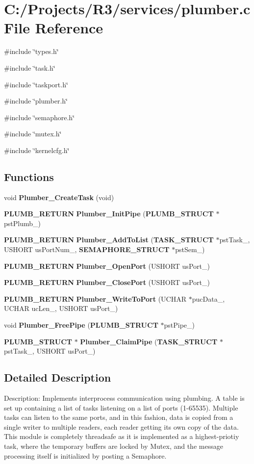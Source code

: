 \section{C:/Projects/R3/services/plumber.c File Reference}
\label{plumber_8c}
{\ttfamily \#include \char`\"{}types.h\char`\"{}}\par
{\ttfamily \#include \char`\"{}task.h\char`\"{}}\par
{\ttfamily \#include \char`\"{}taskport.h\char`\"{}}\par
{\ttfamily \#include \char`\"{}plumber.h\char`\"{}}\par
{\ttfamily \#include \char`\"{}semaphore.h\char`\"{}}\par
{\ttfamily \#include \char`\"{}mutex.h\char`\"{}}\par
{\ttfamily \#include \char`\"{}kernelcfg.h\char`\"{}}\par
\subsection*{Functions}
\begin{DoxyCompactItemize}
\item 
void {\bf Plumber\_\-CreateTask} (void)
\item 
{\bf PLUMB\_\-RETURN} {\bf Plumber\_\-InitPipe} ({\bf PLUMB\_\-STRUCT} $\ast$pstPlumb\_\-)
\item 
{\bf PLUMB\_\-RETURN} {\bf Plumber\_\-AddToList} ({\bf TASK\_\-STRUCT} $\ast$pstTask\_\-, USHORT usPortNum\_\-, {\bf SEMAPHORE\_\-STRUCT} $\ast$pstSem\_\-)
\item 
{\bf PLUMB\_\-RETURN} {\bf Plumber\_\-OpenPort} (USHORT usPort\_\-)
\item 
{\bf PLUMB\_\-RETURN} {\bf Plumber\_\-ClosePort} (USHORT usPort\_\-)
\item 
{\bf PLUMB\_\-RETURN} {\bf Plumber\_\-WriteToPort} (UCHAR $\ast$pucData\_\-, UCHAR ucLen\_\-, USHORT usPort\_\-)
\item 
void {\bf Plumber\_\-FreePipe} ({\bf PLUMB\_\-STRUCT} $\ast$pstPipe\_\-)
\item 
{\bf PLUMB\_\-STRUCT} $\ast$ {\bf Plumber\_\-ClaimPipe} ({\bf TASK\_\-STRUCT} $\ast$pstTask\_\-, USHORT usPort\_\-)
\end{DoxyCompactItemize}


\subsection{Detailed Description}
Description: Implements interprocess communication using plumbing. A table is set up containing a list of tasks listening on a list of ports (1-\/65535). Multiple tasks can listen to the same ports, and in this fashion, data is copied from a single writer to multiple readers, each reader getting its own copy of the data. This module is completely threadsafe as it is implemented as a highest-\/priotiy task, where the temporary buffers are locked by Mutex, and the message processing itself is initialized by posting a Semaphore. 

